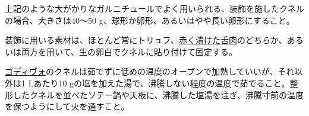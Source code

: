 上記のような大がかりなガルニチュールでよく用いられる、装飾を施したクネルの場合、大きさは40〜50
g、球形か卵形、あるいはやや長い卵形にすること。

装飾に用いる素材は、ほとんど常にトリュフ、\protect\hyperlink{saumure-liquide-pour-langues}{赤く漬けた舌肉}のどちらか、あるいは両方を用いて、生の卵白でクネルに貼り付けて固定する。

\protect\hyperlink{godiveau}{ゴディヴォ}のクネルは茹でずに低めの温度のオーブンで加熱していいが、それ以外は1
Lあたり10
gの塩を加えた湯で、沸騰しない程度の温度で茹でること。整形したクネルを並べたソテー鍋や天板に、沸騰した塩湯を注ぎ、沸騰寸前の温度を保つようにして火を通すこと。
